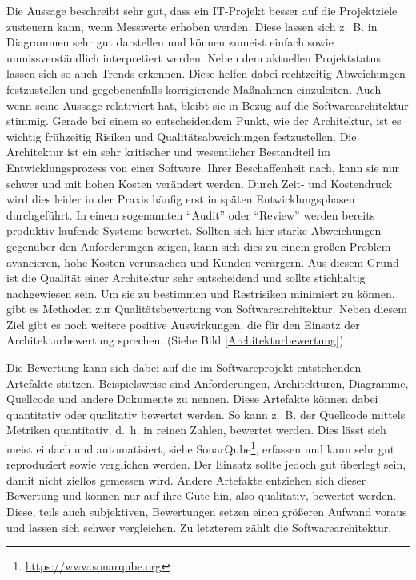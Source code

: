 Die Aussage beschreibt sehr gut, dass ein IT-Projekt besser auf die Projektziele
zusteuern kann, wenn Messwerte erhoben werden. Diese lassen sich z.~B. in Diagrammen sehr gut darstellen und können zumeist einfach sowie unmissverständlich interpretiert werden. Neben dem aktuellen Projektstatus lassen sich so auch Trends erkennen. Diese helfen dabei rechtzeitig Abweichungen festzustellen und gegebenenfalls korrigierende Maßnahmen einzuleiten\cite{Starke2015}. Auch wenn \citeauthor{DeMarco2009} \citeyear{DeMarco2009} seine Aussage relativiert hat\cite{DeMarco2009}, bleibt sie in Bezug auf die Softwarearchitektur stimmig.
Gerade bei einem so entscheidendem Punkt, wie der Architektur, ist es wichtig frühzeitig
Risiken und Qualitätsabweichungen festzustellen. Die Architektur ist ein sehr kritischer
und wesentlicher Bestandteil im Entwicklungsprozess von einer Software. Ihrer Beschaffenheit nach,
kann sie nur schwer und mit hohen Kosten verändert werden.
Durch Zeit- und Kostendruck wird dies leider in der Praxis häufig erst in späten Entwicklungsphasen durchgeführt. 
In einem sogenannten \enquote{Audit} oder \enquote{Review} werden bereits produktiv laufende Systeme bewertet\cite{Starke2015}.
Sollten sich hier starke Abweichungen gegenüber den Anforderungen zeigen, kann sich dies zu einem großen Problem 
avancieren, hohe Kosten verursachen und Kunden verärgern.
Aus diesem Grund ist die Qualität einer Architektur sehr entscheidend und sollte stichhaltig nachgewiesen sein.
Um sie zu bestimmen und Restrisiken minimiert zu können, gibt es Methoden zur Qualitätsbewertung 
von Softwarearchitektur. Neben diesem Ziel gibt es noch weitere positive Auswirkungen, die für den Einsatz der Architekturbewertung sprechen. (Siehe Bild \ref{Architekturbewertung})


Die Bewertung kann sich dabei auf die im Softwareprojekt entstehenden Artefakte stützen. Beispielsweise sind
Anforderungen, Architekturen, Diagramme, Quellcode und andere Dokumente zu nennen. Diese Artefakte können dabei quantitativ 
oder qualitativ bewertet werden. So kann z.~B. der Quellcode mittels Metriken quantitativ, d.~h. in reinen Zahlen, bewertet werden. Dies lässt sich meist einfach und automatisiert, siehe SonarQube\footnote{\url{https://www.sonarqube.org}}, erfassen und kann sehr gut reproduziert sowie verglichen werden. Der Einsatz sollte jedoch gut überlegt sein, damit nicht ziellos gemessen wird.
Andere Artefakte entziehen sich dieser Bewertung und können nur auf ihre Güte hin, also qualitativ, bewertet werden. Diese, teils auch subjektiven, Bewertungen setzen einen größeren Aufwand voraus und lassen sich schwer vergleichen.  
Zu letzterem zählt die Softwarearchitektur.     

